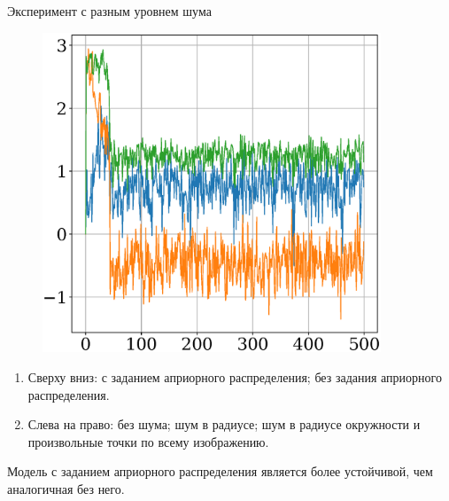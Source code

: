\documentclass[10pt,pdf,hyperref={unicode}]{beamer}
\begin{document}
\begin{frame}{Эксперимент с разным уровнем шума}
\begin{figure}[h]
\begin{minipage}{.27\textwidth}
      \includegraphics[width = 0.9\textwidth]{figures/902noise.eps}
\end{minipage}
\end{figure}

\begin{enumerate}
\item Сверху вниз: с заданием априорного распределения; без задания априорного распределения.
\item Слева на право: без шума; шум в радиусе; шум в радиусе окружности и произвольные точки по всему изображению.
\end{enumerate}

Модель с заданием априорного распределения является более устойчивой, чем аналогичная без него.

\end{frame}
\end{document}
